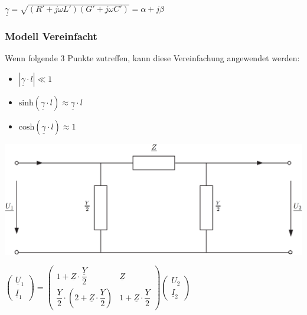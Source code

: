 $
\boxed{\underline{\gamma} = \sqrt{(R' + j\omega L')(G' + j \omega C')} = \alpha + j\beta}
$


\subsubsection{Modell Vereinfacht}

Wenn folgende 3 Punkte zutreffen, kann diese Vereinfachung angewendet werden:\\
\begin{itemize}
    \item $| \underline{\gamma } \cdot l | \ll 1$
    \item $\text{sinh}(\underline{\gamma } \cdot l) \approx \underline{\gamma } \cdot l$
    \item $\text{cosh}(\underline{\gamma } \cdot l) \approx 1$
\end{itemize}

\includegraphics[width=0.98\columnwidth, align=c]{images/Leitungsgleichungen_2.png}

\vspace{0.15cm}

$\boxed{
\begin{pmatrix}
    \underline{U}_1 \\
    \underline{I}_1
    \end{pmatrix}
    =
    \begin{pmatrix}
    1 + \underline{Z} \cdot \dfrac{\underline{Y}}{2} & \underline{Z} \\
    \dfrac{\underline{Y}}{2} \cdot \left( 2 + \underline{Z} \cdot \dfrac{\underline{Y}}{2} \right) & 1 + \underline{Z} \cdot \dfrac{\underline{Y}}{2}
    \end{pmatrix}
    \begin{pmatrix}
    U_2 \\
    \underline{I}_2
\end{pmatrix}
}
$

\vspace{0.15cm}

